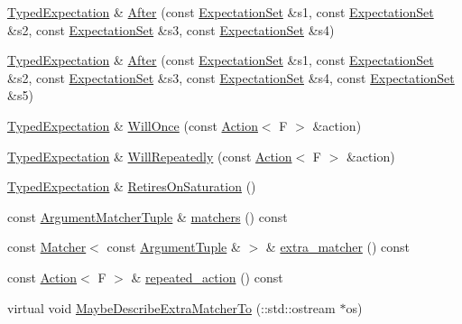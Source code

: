 \begin{DoxyCompactItemize}
\hyperlink{classtesting_1_1internal_1_1_typed_expectation}{Typed\+Expectation} \& \hyperlink{classtesting_1_1internal_1_1_typed_expectation_a1749e368f659352ed8375512acafc178}{After} (const \hyperlink{classtesting_1_1_expectation_set}{Expectation\+Set} \&s1, const \hyperlink{classtesting_1_1_expectation_set}{Expectation\+Set} \&s2, const \hyperlink{classtesting_1_1_expectation_set}{Expectation\+Set} \&s3, const \hyperlink{classtesting_1_1_expectation_set}{Expectation\+Set} \&s4)
\item 
\hyperlink{classtesting_1_1internal_1_1_typed_expectation}{Typed\+Expectation} \& \hyperlink{classtesting_1_1internal_1_1_typed_expectation_a72c0105b147ee2995d183c8e4109f6ca}{After} (const \hyperlink{classtesting_1_1_expectation_set}{Expectation\+Set} \&s1, const \hyperlink{classtesting_1_1_expectation_set}{Expectation\+Set} \&s2, const \hyperlink{classtesting_1_1_expectation_set}{Expectation\+Set} \&s3, const \hyperlink{classtesting_1_1_expectation_set}{Expectation\+Set} \&s4, const \hyperlink{classtesting_1_1_expectation_set}{Expectation\+Set} \&s5)
\item 
\hyperlink{classtesting_1_1internal_1_1_typed_expectation}{Typed\+Expectation} \& \hyperlink{classtesting_1_1internal_1_1_typed_expectation_a41b0d15e44e95d52f4d5c310fb9e9683}{Will\+Once} (const \hyperlink{classtesting_1_1_action}{Action}$<$ F $>$ \&action)
\item 
\hyperlink{classtesting_1_1internal_1_1_typed_expectation}{Typed\+Expectation} \& \hyperlink{classtesting_1_1internal_1_1_typed_expectation_a73586c1adb458c5c431df9679e46f5f1}{Will\+Repeatedly} (const \hyperlink{classtesting_1_1_action}{Action}$<$ F $>$ \&action)
\item 
\hyperlink{classtesting_1_1internal_1_1_typed_expectation}{Typed\+Expectation} \& \hyperlink{classtesting_1_1internal_1_1_typed_expectation_ae7c42958a5d2c336ba7a42a871bf7709}{Retires\+On\+Saturation} ()
\item 
const \hyperlink{classtesting_1_1internal_1_1_typed_expectation_a8f10e3906761cc5c10fa3561c6e8938e}{Argument\+Matcher\+Tuple} \& \hyperlink{classtesting_1_1internal_1_1_typed_expectation_ac5c36609fee376f13bd9cfb2a9b41c9e}{matchers} () const 
\item 
const \hyperlink{classtesting_1_1_matcher}{Matcher}$<$ const \hyperlink{classtesting_1_1internal_1_1_typed_expectation_a9a91379262d101f435809ba4556d14fa}{Argument\+Tuple} \& $>$ \& \hyperlink{classtesting_1_1internal_1_1_typed_expectation_a6a46d9c67fd38c367ce0a0d63e65e523}{extra\+\_\+matcher} () const 
\item 
const \hyperlink{classtesting_1_1_action}{Action}$<$ F $>$ \& \hyperlink{classtesting_1_1internal_1_1_typed_expectation_a3af1ffccd9d897297fb19762b1551dec}{repeated\+\_\+action} () const 
\item 
virtual void \hyperlink{classtesting_1_1internal_1_1_typed_expectation_ab019251041a408dc5a5d8ae216be53f4}{Maybe\+Describe\+Extra\+Matcher\+To} (\+::std\+::ostream $\ast$os)
\end{DoxyCompactItemize}
